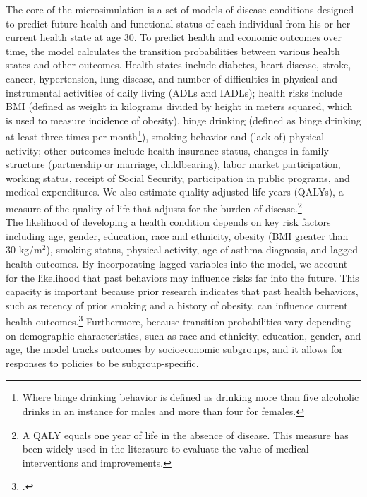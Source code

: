 \noindent The core of the microsimulation is a set of models of disease conditions designed to predict future health and functional status of each individual from his or her current health state at age 30. To predict health and economic outcomes over time, the model calculates the transition probabilities between various health states and other outcomes. Health states include diabetes, heart disease, stroke, cancer, hypertension, lung disease, and number of difficulties in physical and instrumental activities of daily living (ADLs and IADLs); health risks include BMI (defined as weight in kilograms divided by height in meters squared, which is used to measure incidence of obesity), binge drinking (defined as binge drinking at least three times per month\footnote{Where binge drinking behavior is defined as drinking more than five alcoholic drinks in an instance for males and more than four for females.}), smoking behavior and (lack of) physical activity; other outcomes include health insurance status, changes in family structure (partnership or marriage, childbearing), labor market participation, working status, receipt of Social Security, participation in public programs, and medical expenditures. We also estimate quality-adjusted life years (QALYs), a measure of the quality of life that adjusts for the burden of disease.\footnote{A QALY equals one year of life in the absence of disease. This measure has been widely used in the literature to evaluate the value of medical interventions and improvements.} \\

\noindent The likelihood of developing a health condition depends on key risk factors including age, gender, education, race and ethnicity, obesity (BMI greater than 30 kg/m$^2$), smoking status, physical activity, age of asthma diagnosis, and lagged health outcomes. By incorporating lagged variables into the model, we account for the likelihood that past behaviors may influence risks far into the future. This capacity is important because prior research indicates that past health behaviors, such as recency of prior smoking and a history of obesity, can influence current health outcomes.\footnote{\citet{Tong_etal_1996-Lung-Carcinoma,Moore_etal_2008_Past-Body-Mass}.} Furthermore, because transition probabilities vary depending on demographic characteristics, such as race and ethnicity, education, gender, and age, the model tracks outcomes by socioeconomic subgroups, and it allows for responses to policies to be subgroup-specific. \\

